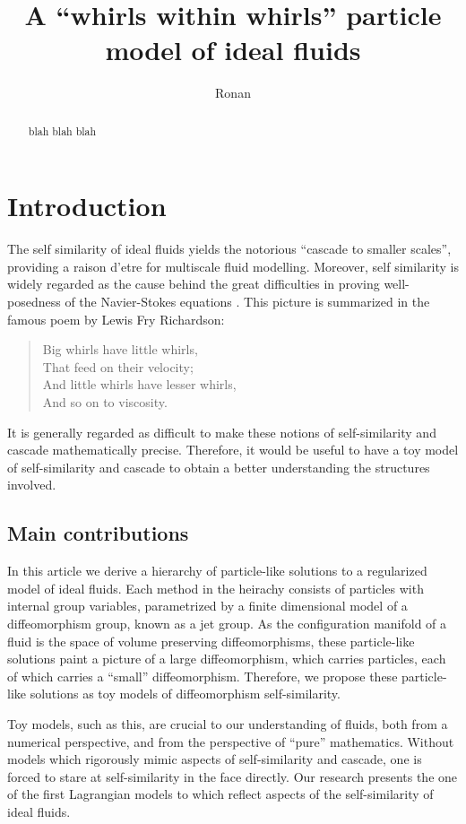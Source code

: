 \documentclass[12pt]{amsart}
\title{A ``whirls within whirls'' particle model of ideal fluids}
\author{Ronan}
\begin{document}
\maketitle

\begin{abstract}
  blah blah blah
\end{abstract}

\section{Introduction}
The self similarity of ideal fluids
yields the notorious ``cascade to smaller scales'',
providing a raison d'etre
for multiscale fluid modelling.
Moreover, self similarity is widely regarded as the cause
behind the great difficulties in proving well-posedness of 
the Navier-Stokes equations \cite{KatzPavlovic2005}.
This picture is summarized in the famous poem by Lewis Fry Richardson:
\begin{quote}
  Big whirls have little whirls,\\
  That feed on their velocity;\\
  And little whirls have lesser whirls,\\
  And so on to viscosity.
\end{quote}
It is generally regarded as difficult to make these 
notions of self-similarity and  cascade mathematically precise.
Therefore, it would be useful to have a toy model of self-similarity and cascade to obtain a better understanding the structures involved.

\subsection{Main contributions}
In this article we derive a hierarchy of particle-like
solutions to a regularized model of ideal fluids.
Each method in the heirachy consists of particles
with internal group variables, parametrized by
a finite dimensional model of a diffeomorphism group,
known as a jet group.
As the configuration manifold of a fluid is the space of
volume preserving diffeomorphisms, these particle-like solutions
paint a picture of a large diffeomorphism, which carries particles,
each of which carries a ``small'' diffeomorphism.
Therefore, we propose these particle-like solutions as toy models
of diffeomorphism self-similarity.

  Toy models, such as this, are crucial to our understanding of fluids,
  both from a numerical perspective, and from the perspective
  of ``pure'' mathematics.
  Without models which rigorously mimic aspects of self-similarity 
  and cascade,
  one is forced to stare at self-similarity in the face directly.
  Our research presents the one of the first Lagrangian models to
  which reflect aspects of the self-similarity of ideal fluids.
\end{document}
